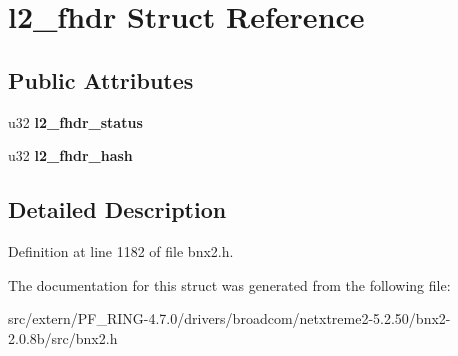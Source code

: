 \hypertarget{structl2__fhdr}{
\section{l2\_\-fhdr Struct Reference}
\label{structl2__fhdr}
}
\subsection*{Public Attributes}
\begin{DoxyCompactItemize}
\item 
\hypertarget{structl2__fhdr_a2067303e9e4018eafab8ba9d5541c77b}{
u32 {\bfseries l2\_\-fhdr\_\-status}}
\label{structl2__fhdr_a2067303e9e4018eafab8ba9d5541c77b}

\item 
\hypertarget{structl2__fhdr_a234cfc3363cde1023bb91a9e11a11488}{
u32 {\bfseries l2\_\-fhdr\_\-hash}}
\label{structl2__fhdr_a234cfc3363cde1023bb91a9e11a11488}

\end{DoxyCompactItemize}


\subsection{Detailed Description}


Definition at line 1182 of file bnx2.h.



The documentation for this struct was generated from the following file:\begin{DoxyCompactItemize}
\item 
src/extern/PF\_\-RING-\/4.7.0/drivers/broadcom/netxtreme2-\/5.2.50/bnx2-\/2.0.8b/src/bnx2.h\end{DoxyCompactItemize}
